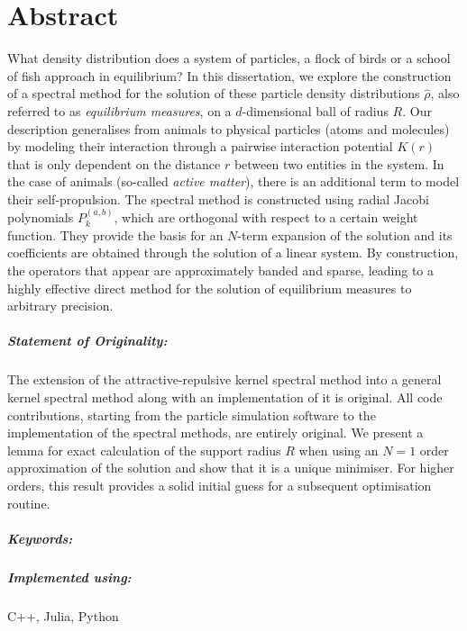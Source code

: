 \chapter*{Abstract}
\label{chap:abstract}
What density distribution does a system of particles, a flock of birds or a school of fish approach in equilibrium?
In this dissertation, we explore the construction of a spectral method for the solution of these particle density distributions $\hat{\rho}$, also referred to as \textit{equilibrium measures}, on a $d$-dimensional ball of radius $R$.
Our description generalises from animals to physical particles (atoms and molecules) by modeling their interaction through a pairwise interaction potential $K(r)$ that is only dependent on the distance $r$ between two entities in the system.
In the case of animals (so-called \textit{active matter}), there is an additional term to model their self-propulsion.
The spectral method is constructed using radial Jacobi polynomials $P_k^{(a,b)}$, which are orthogonal with respect to a certain weight function.
They provide the basis for an $N$-term expansion of the solution and its coefficients are obtained through the solution of a linear system.
By construction, the operators that appear are approximately banded and sparse, leading to a highly effective direct method for the solution of equilibrium measures to arbitrary precision.

\paragraph{Statement of Originality:}
The extension of the attractive-repulsive kernel spectral method into a general kernel spectral method along with an implementation of it is original.
All code contributions, starting from the particle simulation software to the implementation of the spectral methods, are entirely original.
We present a lemma for exact calculation of the support radius $R$ when using an $N = 1$ order approximation of the solution and show that it is a unique minimiser.
For higher orders, this result provides a solid initial guess for a subsequent optimisation routine.

\paragraph{Keywords:}
\thesiskeywords

\paragraph{Implemented using:}
C++, Julia, Python
